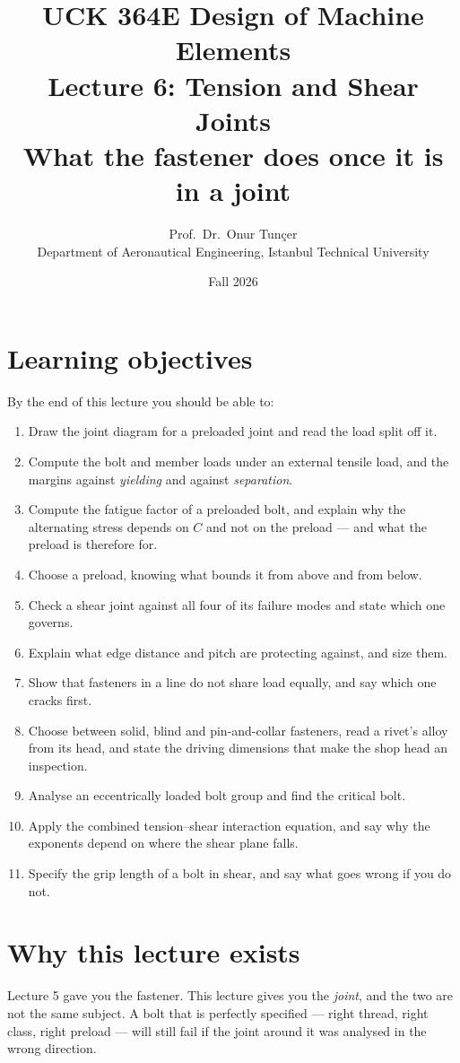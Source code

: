 \documentclass[11pt,a4paper]{article}
\title{\textbf{UCK 364E Design of Machine Elements}\\[4pt]
\Large Lecture 6: Tension and Shear Joints\\[2pt]
\large What the fastener does once it is in a joint}
\author{Prof.\ Dr.\ Onur Tunçer\\ Department of Aeronautical Engineering, Istanbul Technical University}
\date{Fall 2026}
\begin{document}
\maketitle

\section*{Learning objectives}
By the end of this lecture you should be able to:
\begin{enumerate}[nosep]
  \item Draw the joint diagram for a preloaded joint and read the load split off it.
  \item Compute the bolt and member loads under an external tensile load, and the margins against
        \emph{yielding} and against \emph{separation}.
  \item Compute the fatigue factor of a preloaded bolt, and explain why the alternating stress
        depends on $C$ and not on the preload --- and what the preload is therefore for.
  \item Choose a preload, knowing what bounds it from above and from below.
  \item Check a shear joint against all four of its failure modes and state which one governs.
  \item Explain what edge distance and pitch are protecting against, and size them.
  \item Show that fasteners in a line do not share load equally, and say which one cracks first.
  \item Choose between solid, blind and pin-and-collar fasteners, read a rivet's alloy from
        its head, and state the driving dimensions that make the shop head an inspection.
  \item Analyse an eccentrically loaded bolt group and find the critical bolt.
  \item Apply the combined tension--shear interaction equation, and say why the exponents depend on
        where the shear plane falls.
  \item Specify the grip length of a bolt in shear, and say what goes wrong if you do not.
\end{enumerate}

\section{Why this lecture exists}

Lecture 5 gave you the fastener. This lecture gives you the \emph{joint}, and the two are not the
same subject. A bolt that is perfectly specified --- right thread, right class, right preload ---
will still fail if the joint around it was analysed in the wrong direction.
\end{document}
